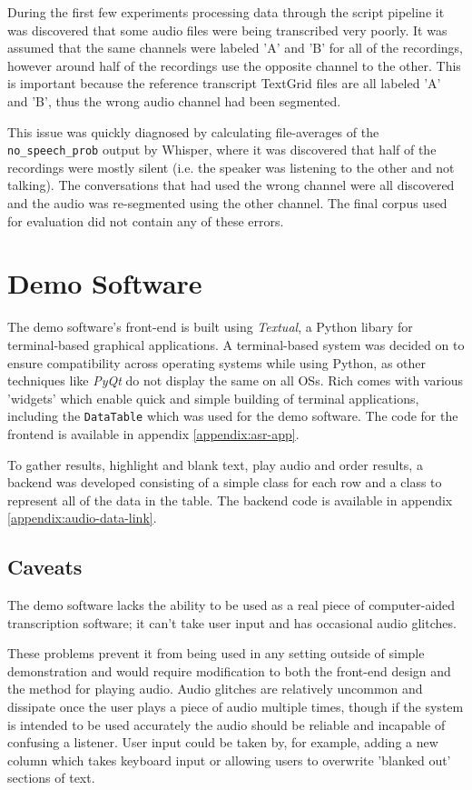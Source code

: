 During the first few experiments processing data through the script pipeline it was discovered that some audio files were being transcribed very poorly.
It was assumed that the same channels were labeled 'A' and 'B' for all of the recordings, however around half of the recordings use the opposite channel to the other.
This is important because the reference transcript TextGrid files are all labeled 'A' and 'B', thus the wrong audio channel had been segmented.

This issue was quickly diagnosed by calculating file-averages of the \texttt{no\_speech\_prob} output by Whisper, where it was discovered that half of the recordings were mostly silent (i.e. the speaker was listening to the other and not talking).
The conversations that had used the wrong channel were all discovered and the audio was re-segmented using the other channel.
The final corpus used for evaluation did not contain any of these errors.

\section{Demo Software}

The demo software's front-end is built using \emph{Textual}\cite{textual}, a Python libary for terminal-based graphical applications.
A terminal-based system was decided on to ensure compatibility across operating systems while using Python, as other techniques like \emph{PyQt}\cite{pyqt} do not display the same on all OSs.
Rich comes with various 'widgets' which enable quick and simple building of terminal applications, including the \texttt{DataTable} which was used for the demo software.
The code for the frontend is available in appendix \ref{appendix:asr-app}.

To gather results, highlight and blank text, play audio and order results, a backend was developed consisting of a simple class for each row and a class to represent all of the data in the table.
The backend code is available in appendix \ref{appendix:audio-data-link}.

\subsection{Caveats}

The demo software lacks the ability to be used as a real piece of computer-aided transcription software;
it can't take user input and has occasional audio glitches.

These problems prevent it from being used in any setting outside of simple demonstration and would require modification to both the front-end design and the method for playing audio.
Audio glitches are relatively uncommon and dissipate once the user plays a piece of audio multiple times, though if the system is intended to be used accurately the audio should be reliable and incapable of confusing a listener.
User input could be taken by, for example, adding a new column which takes keyboard input or allowing users to overwrite 'blanked out' sections of text.
